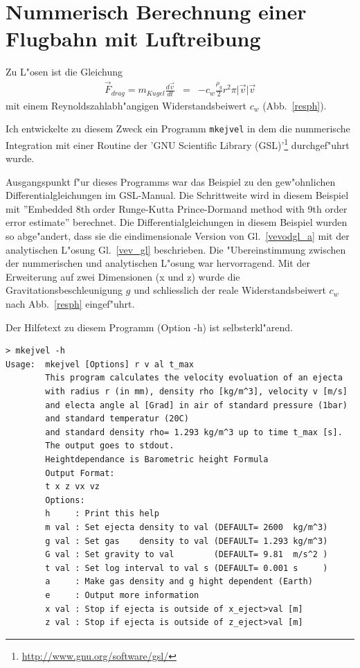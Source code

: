 \section{Nummerisch Berechnung einer Flugbahn mit Luftreibung}\label{mkejv_a}
Zu L"osen ist die Gleichung 
\begin{eqnarray}
\vec{F}_{drag}=m_{Kugel}\frac{d\vec{v}}{dt}&=&-c_w\frac{\rho_{g}}{2}r^2\pi \vert \vec{v}| \vec{v}\label{vevodgl_a} 
\end{eqnarray}
mit einem Reynoldszahlabh"angigen Widerstandsbeiwert $c_w$ (Abb.\ \ref{resph}).

Ich entwickelte zu diesem Zweck ein Programm \verb|mkejvel| in dem die nummerische Integration mit einer Routine der 'GNU Scientific Library (GSL)'\footnote{\url{http://www.gnu.org/software/gsl/}} durchgef"uhrt wurde. 

Ausgangspunkt f"ur dieses Programms war das Beispiel zu den gew"ohnlichen Differentialgleichungen im GSL-Manual. Die Schrittweite wird in diesem Beispiel mit ''Embedded 8th order Runge-Kutta Prince-Dormand method with 9th order error estimate'' berechnet. Die Differentialgleichungen in diesem Beispiel wurden so abge"andert, dass sie die eindimensionale Version von Gl.\ \ref{vevodgl_a} mit der analytischen L"osung Gl.\ \ref{vev_gl} beschrieben. Die "Ubereinstimmung zwischen der nummerischen und analytischen L"osung war hervorragend. Mit der Erweiterung auf zwei Dimensionen (x und z) wurde die Gravitationsbeschleunigung $g$ und schliesslich der reale Widerstandsbeiwert $c_w$ nach Abb.\ \ref{resph} eingef"uhrt. 

Der Hilfetext zu diesem Programm (Option -h) ist selbsterkl"arend.
\begin{small}
\begin{verbatim}
> mkejvel -h
Usage:  mkejvel [Options] r v al t_max
        This program calculates the velocity evoluation of an ejecta
        with radius r (in mm), density rho [kg/m^3], velocity v [m/s]
        and electa angle al [Grad] in air of standard pressure (1bar)
        and standard temperatur (20C)
        and standard density rho= 1.293 kg/m^3 up to time t_max [s].
        The output goes to stdout.
        Heightdependance is Barometric height Formula
        Output Format:
        t x z vx vz
        Options:
        h     : Print this help
        m val : Set ejecta density to val (DEFAULT= 2600  kg/m^3)
        g val : Set gas    density to val (DEFAULT= 1.293 kg/m^3)
        G val : Set gravity to val        (DEFAULT= 9.81  m/s^2 )
        t val : Set log interval to val s (DEFAULT= 0.001 s     )
        a     : Make gas density and g hight dependent (Earth)
        e     : Output more information
        x val : Stop if ejecta is outside of x_eject>val [m]
        z val : Stop if ejecta is outside of z_eject>val [m]
\end{verbatim}
\end{small}
